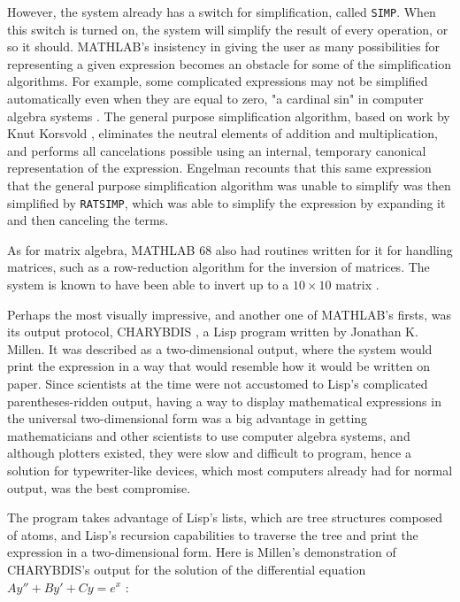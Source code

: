 However, the system already has a switch for simplification, called \verb|SIMP|. When this switch is turned on, the system will simplify the result of every operation, or so it should. MATHLAB's insistency in giving the user as many possibilities for representing a given expression becomes an obstacle for some of the simplification algorithms. For example, some complicated expressions may not be simplified automatically even when they are equal to zero, "a cardinal sin" in computer algebra systems \parencite{engelman1971legacy}. The general purpose simplification algorithm, based on work by Knut Korsvold \parencite{korsvold1966line}, eliminates the neutral elements of addition and multiplication, and performs all cancelations possible using an internal, temporary canonical representation of the expression. Engelman recounts that this same expression that the general purpose simplification algorithm was unable to simplify was then simplified by \verb|RATSIMP|, which was able to simplify the expression by expanding it and then canceling the terms.

As for matrix algebra, MATHLAB 68 also had routines written for it for handling matrices, such as a row-reduction algorithm for the inversion of matrices. The system is known to have been able to invert up to a $10 \times 10$ matrix \parencite{engelman1971legacy}.

Perhaps the most visually impressive, and another one of MATHLAB's firsts, was its output protocol, CHARYBDIS \parencite{millen1967charybdis}, a Lisp program written by Jonathan K. Millen. It was described as a two-dimensional output, where the system would print the expression in a way that would resemble how it would be written on paper. Since scientists at the time were not accustomed to Lisp's complicated parentheses-ridden output, having a way to display mathematical expressions in the universal two-dimensional form was a big advantage in getting mathematicians and other scientists to use computer algebra systems, and although plotters existed, they were slow and difficult to program, hence a solution for typewriter-like devices, which most computers already had for normal output, was the best compromise.

The program takes advantage of Lisp's lists, which are tree structures composed of atoms, and Lisp's recursion capabilities to traverse the tree and print the expression in a two-dimensional form. Here is Millen's demonstration of CHARYBDIS's output for the solution of the differential equation $Ay'' + By' + Cy = e^{x}$ \parencite{millen1967charybdis}:


